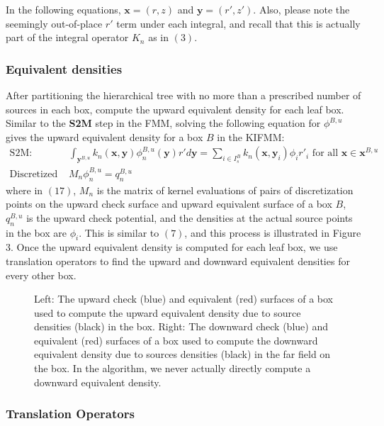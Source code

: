 In the following equations, $\mathbf{x}=(r,z)$ and $\mathbf{y}=(r',z')$. Also, please note the seemingly out-of-place $r'$ term under each integral, and recall that this is actually part of the integral operator $K_n$ as in $(3)$.
\subsubsection{Equivalent densities}
After partitioning the hierarchical tree with no more than a prescribed number of sources in each box, compute the upward equivalent density for each leaf box. Similar to the \textbf{S2M} step in the FMM, solving the following equation for $\phi^{B,u}$ gives the upward equivalent density for a box $B$ in the KIFMM:
\begin{align}
\mbox{S2M: }&\int_{\mathbf{y}^{B,u}}{k_n(\mathbf{x},\mathbf{y})}\phi^{B,u}_n{(\mathbf{y})}r'd\mathbf{y}=\sum\limits_{i\in I_s^B} k_n(\mathbf{x},\mathbf{y}_i)\phi_ir'_i\mbox{ for all }\mathbf{x}\in\mathbf{x}^{B,u}\\
\mbox{Discretized S2M: }&M_n\phi^{B,u}_n=q_n^{B,u}
\end{align}
where in $(17)$, $M_n$ is the matrix of kernel evaluations of pairs of discretization points on the upward check surface and upward equivalent surface of a box $B$, $q_n^{B,u}$ is the upward check potential, and the densities at the actual source points in the box are $\phi_i$. This is similar to $(7)$, and this process is illustrated in Figure 3. Once the upward equivalent density is computed for each leaf box, we use translation operators to find the upward and downward equivalent densities for every other box.

\begin{figure}[!ht]
\begin{center}
\end{center}
\caption{Left: The upward check (blue) and equivalent (red) surfaces of a box used to compute the upward equivalent density due to source densities (black) in the box. Right: The downward check (blue) and equivalent (red) surfaces of a box used to compute the downward equivalent density due to sources densities (black) in the far field on the box. In the algorithm, we never actually directly compute a downward equivalent density.}
\end{figure}

\subsubsection{Translation Operators}

